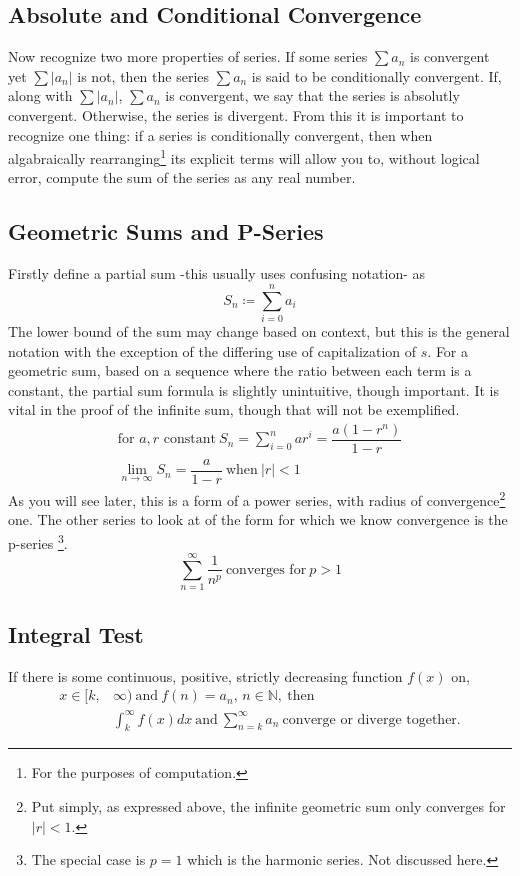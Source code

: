 \documentclass[11pt]{article}
\newcommand{\define}{\coloneqq}
\newcommand{\innat}{\in\mathbb{N}}
\begin{document}
	\subsection*{Absolute and Conditional Convergence}
		Now recognize two more properties of series. If some series $\sum a_n$ is convergent yet $\sum |a_n|$ is not, then the series $\sum a_n$
		is said to be conditionally convergent. If, along with $\sum |a_n|$, $\sum a_n$ is convergent, we say that the series is absolutly
		convergent. Otherwise, the series is divergent. From this it is important to recognize one thing: if a series is conditionally convergent,
		then when algabraically rearranging\footnote{For the purposes of computation.} its explicit terms will allow you to, 
		without logical error, compute the sum of the series as any real number.

	\subsection*{Geometric Sums and P-Series}
		Firstly define a partial sum -this usually uses confusing notation- as
			\begin{equation}
				S_n \define \sum_{i = 0}^{n}a_i
			\end{equation}
		The lower bound of the sum may change based on context, but this is the general notation with the exception of the differing use of capitalization
		of $s$. For a geometric sum, based on a sequence where the ratio between each term is a constant, the partial sum formula is slightly unintuitive,
		though important. It is vital in the proof of the infinite sum, though that will not be exemplified.
			\begin{gather}
				\text{for $a,r$ constant} \ S_n= \sum_{i = 0}^{n} ar^i = \dfrac{a(1-r^n)}{1-r} \\
				\lim_{n\to\infty} S_n = \dfrac{a}{1-r} \ \text{when} \ |r| < 1 
			\end{gather}
		As you will see later, this is a form of a power series, with radius of convergence\footnote{Put simply, as expressed above, the infinite
		geometric sum only converges for $|r| < 1$.} one. The other series to look at of the form for which we know convergence is the p-series
		\footnote{The special case is $p = 1$ which is the harmonic series. Not discussed here.}. 
			\begin{equation}
				\sum_{n=1}^{\infty} \frac{1}{n^p} \ \text{converges for}\ p > 1
			\end{equation}

	\subsection*{Integral Test}
		If there is some continuous, positive, strictly decreasing function $f(x)$ on,
			\begin{align}
				x\in[k,&\infty)\ \text{and}\ f(n) = a_n,\, n\innat,\ \text{then}\\
				&\int_{k}^{\infty} f(x)dx\ \text{and}\ \sum_{n = k}^{\infty} a_n\ \text{converge or diverge together.}
			\end{align}
\end{document}
